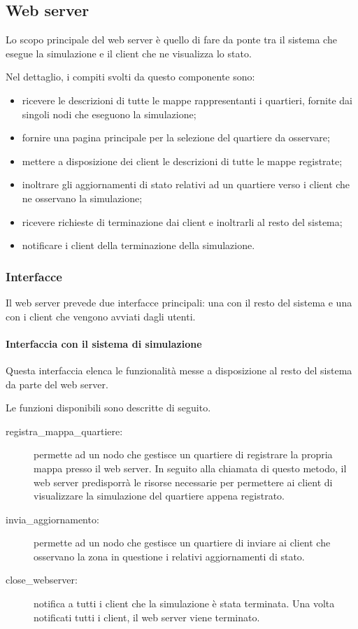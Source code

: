 \subsection{Web server}
Lo scopo principale del web server è quello di fare da ponte tra il sistema che
esegue la simulazione e il client che ne visualizza lo stato.

Nel dettaglio, i compiti svolti da questo componente sono:
\begin{itemize}
	\item ricevere le descrizioni di tutte le mappe rappresentanti i quartieri,
	fornite dai singoli nodi che eseguono la simulazione;
	\item fornire una pagina principale per la selezione del quartiere da
	osservare;
	\item mettere a disposizione dei client le descrizioni di tutte le mappe
	registrate;
	\item inoltrare gli aggiornamenti di stato relativi ad un quartiere verso i
	client che ne osservano la simulazione;
	\item ricevere richieste di terminazione dai client e inoltrarli al resto del
	sistema;
	\item notificare i client della terminazione della simulazione.
\end{itemize}

\subsubsection{Interfacce}
Il web server prevede due interfacce principali: una con il resto del sistema e
una con i client che vengono avviati dagli utenti.

\paragraph*{Interfaccia con il sistema di simulazione}
Questa interfaccia elenca le funzionalità messe a disposizione al resto del
sistema da parte del web server.

Le funzioni disponibili sono descritte di seguito.
\begin{description}
	\item[registra\_mappa\_quartiere:] permette ad un nodo che gestisce un
	quartiere di registrare la propria mappa presso il web server. In seguito alla
	chiamata di questo metodo, il web server predisporrà le risorse necessarie per
	permettere ai client di visualizzare la simulazione del quartiere appena
	registrato.
	\item[invia\_aggiornamento:] permette ad un nodo che gestisce un quartiere di
	inviare ai client che osservano la zona in questione i relativi aggiornamenti
	di stato.
	\item[close\_webserver:] notifica a tutti i client che la simulazione è stata
	terminata. Una volta notificati tutti i client, il web server viene terminato.
\end{description}

